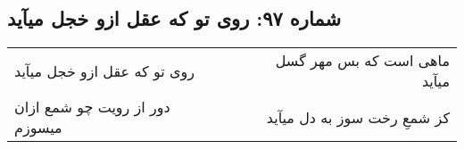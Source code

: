 \begin{center}
\section*{شماره ۹۷: روی تو که عقل ازو خجل میآید}
\label{sec:097}
\begin{longtable}{l p{0.5cm} r}
روی تو که عقل ازو خجل میآید
&&
ماهی است که بس مهر گسل میآید
\\
دور از رویت چو شمع ازان میسوزم
&&
کز شمعِ رخت سوز به دل میآید
\\
\end{longtable}
\end{center}

